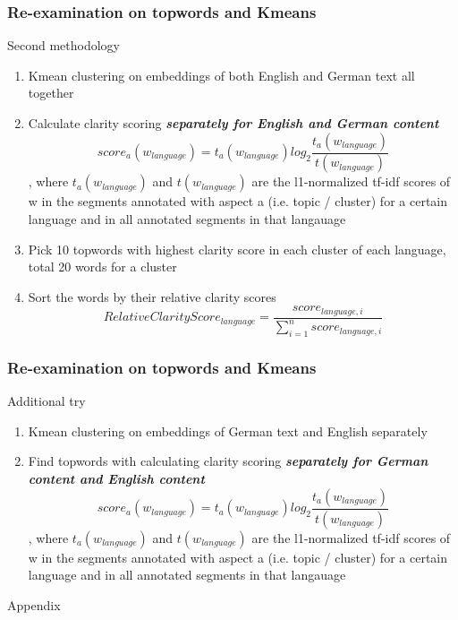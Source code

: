 \documentclass{tum-presentation}
\begin{document}
\begin{frame}
  \frametitle{Re-examination on topwords and Kmeans}
    Second methodology
    \begin{enumerate}
      \item Kmean clustering on embeddings of both English and German text all together
      \item Calculate clarity scoring \textbf{\emph{separately for English and German content}} \[score_a(w_{language}) = t_a(w_{language}) log_2\frac{t_a(w_{language})}{t(w_{language})}\], where $t_a(w_{language})$ and $t(w_{language})$ are the l1-normalized tf-idf scores of w in the segments annotated with aspect a (i.e. topic / cluster) for a certain language and in all annotated segments in that langauage
      \item Pick 10 topwords with highest clarity score in each cluster of each language, total 20 words for a cluster
      \item Sort the words by their relative clarity scores
      \[RelativeClarityScore_{language} = \frac{score_{language, i}}{\sum_{i=1}^{n} score_{language, i}}\]
    \end{enumerate}
\end{frame}


\begin{frame}
  \frametitle{Re-examination on topwords and Kmeans}
    Additional try
    \begin{enumerate}
      \item Kmean clustering on embeddings of German text and English separately
      \item Find topwords with calculating clarity scoring \textbf{\emph{separately for German content and English content}} \[score_a(w_{language}) = t_a(w_{language}) log_2\frac{t_a(w_{language})}{t(w_{language})}\], where $t_a(w_{language})$ and $t(w_{language})$ are the l1-normalized tf-idf scores of w in the segments annotated with aspect a (i.e. topic / cluster) for a certain language and in all annotated segments in that langauage
    \end{enumerate}
\end{frame}

\begin{frame}
    \vspace{4cm}
    \centering
    \Large{Appendix}
\end{frame}
\end{document}

